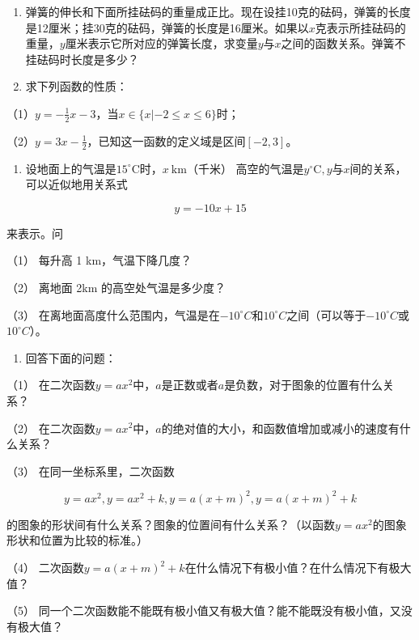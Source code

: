 \begin{enumerate}[start=6]
\item
  弹簧的伸长和下面所挂砝码的重量成正比。现在设挂10克的砝码，弹簧的长度是12厘米；挂30克的砝码，弹簧的长度是16厘米。如果以\(x\)克表示所挂砝码的重量，\(y\)厘米表示它所对应的弹簧长度，求变量\(y\)与\(x\)之间的函数关系。弹簧不挂砝码时长度是多少？
\item
  求下列函数的性质：
\end{enumerate}

（1）\(y = -\frac{1}{2} x - 3\)，当\(x \in \{x | -2 \leqslant x \leqslant 6\}\)时；

（2）\(y = 3x - \frac{1}{2}\)，已知这一函数的定义域是区间\([-2, 3]\)。

\begin{enumerate}[start=8]
\item
  设地面上的气温是\(15^{\circ} \mathrm{C}\)时，\(x \mathrm{~km}\)（千米）
  高空的气温是\(y^{\circ} \mathrm{C}, y\)与\(x\)间的关系，可以近似地用关系式
\end{enumerate}

\[
y = - 10 x + 15
\]

来表示。问

（1） 每升高 1 km，气温下降几度？

（2） 离地面 2km 的高空处气温是多少度？

（3）
在离地面高度什么范围内，气温是在\(-10^{\circ}C\)和\(10^{\circ}C\)之间（可以等于\(-10^{\circ}C\)或\(10^{\circ}C\)）。

\begin{enumerate}[start=9]
\item
  回答下面的问题：
\end{enumerate}

（1）
在二次函数\(y = ax^2\)中，\(a\)是正数或者\(a\)是负数，对于图象的位置有什么关系？

（2）
在二次函数\(y = ax^2\)中，\(a\)的绝对值的大小，和函数值增加或减小的速度有什么关系？

（3） 在同一坐标系里，二次函数

\[
y = a x^{2}, y = a x^{2} + k, y = a (x + m)^{2}, y = a (x + m)^{2} + k
\]

的图象的形状间有什么关系？图象的位置间有什么关系？（以函数\(y = ax^2\)的图象形状和位置为比较的标准。）

（4）
二次函数\(y = a(x + m)^2 + k\)在什么情况下有极小值？在什么情况下有极大值？

（5）
同一个二次函数能不能既有极小值又有极大值？能不能既没有极小值，又没有极大值？

